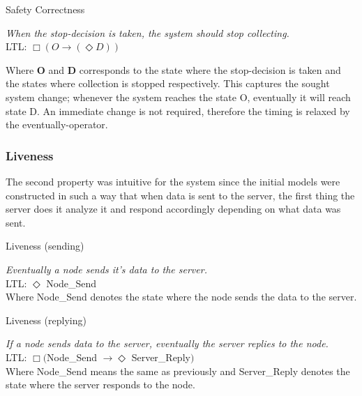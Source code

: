 
\begin{definition}{}{} 
Safety Correctness

\textit{When the stop-decision is taken, the system should stop collecting.} \\ 

LTL: $\Box (O \rightarrow (\Diamond D)) $ \\
\end{definition}

Where \textbf{O} and \textbf{D} corresponds to the state where the stop-decision is taken and the states where collection is stopped respectively. This captures the sought system change; whenever the system reaches the state O, eventually it will reach state D. An immediate change is not required, therefore the timing is relaxed by the eventually-operator.

\subsubsection{Liveness}


The second property was intuitive for the system since the initial models were constructed in such a way that when data is sent to the server, the first thing the server does it analyze it and respond accordingly depending on what data was sent.  

\begin{definition}{}{}
Liveness (sending)

\textit{Eventually a node sends it's data to the server.} \\

LTL: $\Diamond$ Node\_Send \\

Where Node\_Send denotes the state where the node sends the data to the server. \\
\end{definition} 

\begin{definition}{}{}
Liveness (replying)

\textit{If a node sends data to the server, eventually the server replies to the node.} \\

LTL: $\Box ($Node\_Send $\rightarrow \Diamond$ Server\_Reply$)$ \\

Where Node\_Send means the same as previously and Server\_Reply denotes the state where the server responds to the node.
\end{definition}

